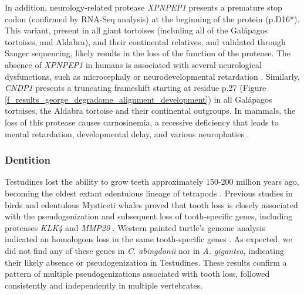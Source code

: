 In addition, neurology-related protease \textit{XPNPEP1} presents a premature stop codon (confirmed by RNA-Seq analysis) at the beginning of the protein (p.D16*).
This variant, present in all giant tortoises (including all of the Gal\'{a}pagos tortoises, and Aldabra), and their continental relatives, and validated through Sanger sequencing, likely results in the loss of the function of the protease.
The absence of \textit{XPNPEP1} in humans is associated with several neurological dysfunctions, such as microcephaly or neurodevelopmental retardation \cite{Yoon2012}.
Similarly, \textit{CNDP1} presents a truncating frameshift starting at residue {p.27} (Figure \ref{f_results_george_degradome_alignment_development}) in all Gal\'{a}pagos tortoises, the Aldabra tortoise and their continental outgroups.
In mammals, the loss of this protease causes carnosinemia, a recessive deficiency that leads to mental retardation, developmental delay, and various neurophaties \cite{Bellia2014,Hu2007}.

\subsubsection{Dentition}

Testudines lost the ability to grow teeth approximately 150-200 million years ago, becoming the oldest extant edentulous lineage of tetrapods \cite{Davit-Beal2009}.
Previous studies in birds and edentulous Mysticeti whales proved that tooth loss is closely associated with the pseudogenization and subsequent loss of tooth-specific genes, including proteases \textit{KLK4} and \textit{MMP20} \cite{Keane2015,Meredith2014a}.
Western painted turtle's genome analysis indicated an homologous loss in the same tooth-specific genes \cite{BradleyShaffer2013}.
As expected, we did not find any of these genes in \textit{C. abingdonii} nor in \textit{A. gigantea}, indicating their likely absence or pseudogenization in Testudines.
These results confirm a pattern of multiple pseudogenizations associated with tooth loss, followed consistently and independently in multiple vertebrates.
